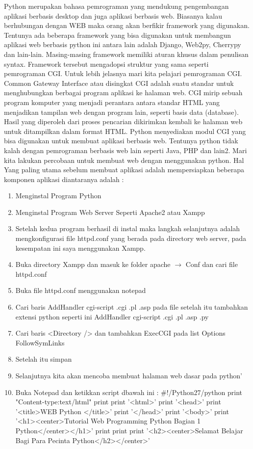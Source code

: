 \begin{enumerate}
Python merupakan bahasa pemrograman yang mendukung pengembangan aplikasi berbasis desktop dan juga aplikasi berbasis web. Biasanya kalau berhubungan dengan WEB maka orang akan berfikir framework yang digunakan. Tentunya ada beberapa framework yang bisa digunakan untuk membangun aplikasi web berbasis python ini antara lain adalah Django, Web2py, Cherrypy dan lain-lain. Masing-masing framework memiliki aturan khusus dalam penulisan syntax. Framework tersebut mengadopsi struktur yang sama seperti pemrograman CGI. Untuk lebih jelasnya mari kita pelajari pemrograman CGI. 
Common Gateway Interface atau disingkat CGI adalah suatu standar untuk menghubungkan berbagai program aplikasi ke halaman web. CGI mirip sebuah program komputer yang menjadi perantara antara standar HTML yang menjadikan tampilan web dengan program lain, seperti basis data (database). Hasil yang diperoleh dari proses pencarian dikirimkan kembali ke halaman web untuk ditampilkan dalam format HTML.
Python menyediakan modul CGI yang bisa digunakan untuk membuat aplikasi berbasis web. Tentunya python tidak kalah dengan pemrograman berbasis web lain seperti Java, PHP dan lain2. Mari kita lakukan percobaan untuk membuat web dengan menggunakan python. 
Hal Yang paling utama sebelum membuat aplikasi adalah mempersiapkan beberapa komponen aplikasi diantaranya adalah : 
\begin{enumerate}
	\item Menginstal Program Python  
	\item Menginstal Program Web Server Seperti Apache2 atau Xampp  
	\item Setelah kedua program berhasil di instal maka langkah selanjutnya adalah mengkonfigurasi file httpd.conf yang berada pada directory web server, pada kesempatan ini saya menggunakan Xampp. 
	\item Buka directory Xampp dan masuk ke folder apache  $  \rightarrow  $ Conf dan cari file httpd.conf 
	\item Buka file httpd.conf menggunakan notepad 
	\item Cari baris AddHandler cgi-script .cgi .pl .asp pada file setelah itu tambahkan extensi python seperti ini AddHandler cgi-script .cgi .pl .asp .py 
	\item Cari baris <Directory /> dan tambahkan ExecCGI pada list Options FollowSymLinks  
	\item Setelah itu simpan 
	\item Selanjutnya kita akan mencoba membuat halaman web dasar pada python’ 
	\item Buka Notepad dan ketikkan script dbawah ini : 
	$  \#  $!/Python27/python 
	print "Content-type:text/html"
	print 
	print '<html>' 
	print '<head>' 
	print '<title>WEB Python </title>' 
	print '</head>' 
	print '<body>' 
	print '<h1><center>Tutorial Web Programming Python Bagian 1 Python</center></h1>' 
	print 
	print 
	print '<h2><center>Selamat Belajar Bagi Para Pecinta Python</h2></center>' 
	

\end{enumerate}
\end{enumerate}
